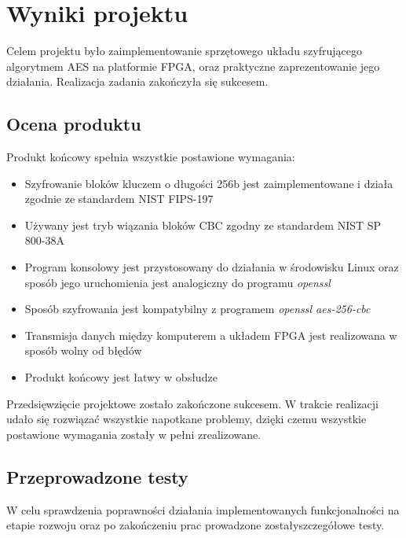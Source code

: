 \section{Wyniki projektu}
\label{sec:wyniki-projektu}


Celem projektu było zaimplementowanie sprzętowego układu szyfrującego algorytmem AES na platformie FPGA, oraz praktyczne zaprezentowanie jego działania. Realizacja zadania zakończyła się sukcesem.

\subsection{Ocena produktu}
Produkt końcowy spełnia wszystkie postawione wymagania:
\begin{itemize}
\item Szyfrowanie bloków kluczem o długości 256b jest zaimplementowane i działa zgodnie ze standardem NIST FIPS-197 \cite{aes-standard}
\item Używany jest tryb wiązania bloków CBC zgodny ze standardem NIST SP 800-38A \cite{cbc-standard}
\item Program konsolowy jest przystosowany do działania w środowisku Linux oraz sposób jego uruchomienia jest analogiczny do programu \textit{openssl}
\item Sposób szyfrowania jest kompatybilny z programem \textit{openssl aes-256-cbc} 
\item Transmisja danych między komputerem a układem FPGA jest realizowana w sposób wolny od błędów
\item Produkt końcowy jest łatwy w obsłudze
\end{itemize}

Przedsięwzięcie projektowe zostało zakończone sukcesem. W trakcie realizacji udało się rozwiązać wszystkie napotkane problemy, dzięki czemu wszystkie postawione wymagania zostały w pełni zrealizowane.

\subsection{Przeprowadzone testy}
W celu sprawdzenia poprawności działania implementowanych funkcjonalności na etapie rozwoju oraz po zakończeniu prac prowadzone zostałyszczegółowe testy.

